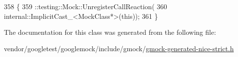 \begin{DoxyCode}
358                         \{
359     ::testing::Mock::UnregisterCallReaction(
360         internal::ImplicitCast\_<MockClass*>(\textcolor{keyword}{this}));
361   \}
\end{DoxyCode}


The documentation for this class was generated from the following file\+:\begin{DoxyCompactItemize}
\item 
vendor/googletest/googlemock/include/gmock/\hyperlink{gmock-generated-nice-strict_8h}{gmock-\/generated-\/nice-\/strict.\+h}\end{DoxyCompactItemize}
